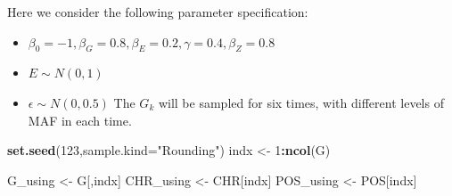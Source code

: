 \documentclass[
]{article}
\newenvironment{Shaded}{\begin{snugshade}}{\end{snugshade}}
\newcommand{\DataTypeTok}[1]{\textcolor[rgb]{0.13,0.29,0.53}{#1}}
\newcommand{\DecValTok}[1]{\textcolor[rgb]{0.00,0.00,0.81}{#1}}
\newcommand{\KeywordTok}[1]{\textcolor[rgb]{0.13,0.29,0.53}{\textbf{#1}}}
\newcommand{\NormalTok}[1]{#1}
\newcommand{\OperatorTok}[1]{\textcolor[rgb]{0.81,0.36,0.00}{\textbf{#1}}}
\newcommand{\StringTok}[1]{\textcolor[rgb]{0.31,0.60,0.02}{#1}}
\providecommand{\tightlist}{%
  \setlength{\itemsep}{0pt}\setlength{\parskip}{0pt}}
\begin{document}
Here we consider the following parameter specification:

\begin{itemize}
\tightlist
\item
  \(\beta_0= -1, \beta_G=0.8, \beta_E= 0.2,\gamma=0.4, \beta_Z=0.8\)
\item
  \(E \sim N(0,1)\)
\item
  \(\epsilon \sim N(0,0.5)\) The \(G_k\) will be sampled for six times,
  with different levels of MAF in each time.
\end{itemize}

\begin{Shaded}
\begin{Highlighting}[]
\KeywordTok{set.seed}\NormalTok{(}\DecValTok{123}\NormalTok{,}\DataTypeTok{sample.kind=}\StringTok{"Rounding"}\NormalTok{)}
\NormalTok{indx <-}\StringTok{ }\DecValTok{1}\OperatorTok{:}\KeywordTok{ncol}\NormalTok{(G)}

\NormalTok{G_using <-}\StringTok{ }\NormalTok{G[,indx]}
\NormalTok{CHR_using <-}\StringTok{ }\NormalTok{CHR[indx]}
\NormalTok{POS_using <-}\StringTok{ }\NormalTok{POS[indx]}


\end{Highlighting}
\end{Shaded}
\end{document}
